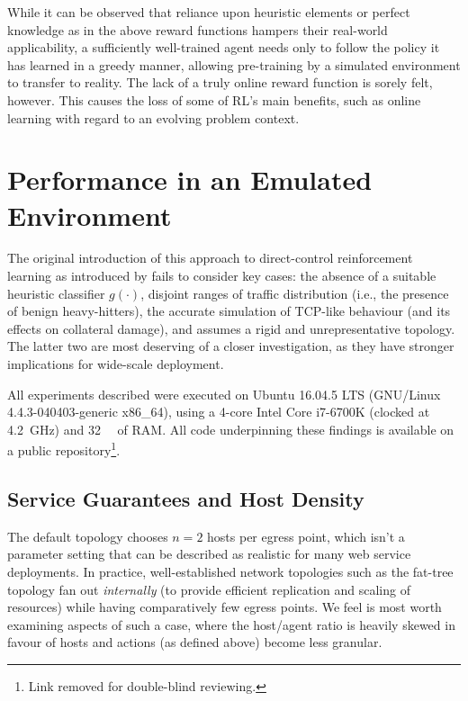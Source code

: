 \documentclass[conference, letterpaper, 10pt, times]{IEEEtran}
\begin{document}
While it can be observed that reliance upon heuristic elements or perfect knowledge as in the above reward functions hampers their real-world applicability, a sufficiently well-trained agent needs only to follow the policy it has learned in a greedy manner, allowing pre-training by a simulated environment to transfer to reality.
The lack of a truly online reward function is sorely felt, however.
This causes the loss of some of RL's main benefits, such as online learning with regard to an evolving problem context.

\section{Performance in an Emulated Environment}\label{sec:performance-in-an-emulated-environment}
The original introduction of this approach to direct-control reinforcement learning as introduced by \textcite{DBLP:journals/eaai/MalialisK15} fails to consider key cases: the absence of a suitable heuristic classifier $g(\cdot)$, disjoint ranges of traffic distribution (i.e., the presence of benign heavy-hitters), the accurate simulation of TCP-like behaviour (and its effects on collateral damage), and assumes a rigid and unrepresentative topology.
The latter two are most deserving of a closer investigation, as they have stronger implications for wide-scale deployment.

All experiments described were executed on Ubuntu 16.04.5 LTS (GNU/Linux 4.4.3-040403-generic x86\_64), using a 4-core Intel Core i7-6700K (clocked at \SI{4.2}{\giga\hertz}) and \SI{32}{\gibi\byte} of RAM.
All code underpinning these findings is available on a public repository\footnote{Link removed for double-blind reviewing.}.


\subsection{Service Guarantees and Host Density}
The default topology chooses $n=2$ hosts per egress point, which isn't a parameter setting that can be described as realistic for many web service deployments.
In practice, well-established network topologies such as the fat-tree topology fan out \emph{internally} (to provide efficient replication and scaling of resources) while having comparatively few egress points.
We feel is most worth examining aspects of such a case, where the host/agent ratio is heavily skewed in favour of hosts and actions (as defined above) become less granular.
\end{document}
